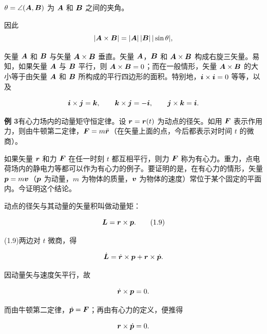$\theta = \angle(\bm{A}, \bm{B})$ 为 $\bm{A}$ 和 $\bm{B}$ 之间的夹角。

因此
\begin{equation*}
|\bm{A} \times \bm{B}| = |\bm{A}|\,|\bm{B}|\,|\sin\theta|,
\end{equation*}

矢量 $\bm{A}$ 和 $\bm{B}$ 与矢量 $\bm{A} \times \bm{B}$ 垂直。矢量 $\bm{A}$，$\bm{B}$ 和 $\bm{A} \times \bm{B}$ 构成右旋三矢量。易知，如果矢量 $\bm{A}$ 与 $\bm{B}$ 平行，则 $\bm{A} \times \bm{B} = 0$；而在一般情形，矢量 $\bm{A} \times \bm{B}$ 的大小等于由矢量 $\bm{A}$ 和 $\bm{B}$ 所构成的平行四边形的面积。特别地，$\bm{i} \times \bm{i} = 0$ 等等，以及

\begin{equation*}
\bm{i} \times \bm{j} = \bm{k}, \qquad \bm{k} \times \bm{j} = -\bm{i}, \qquad \bm{j} \times \bm{k} = \bm{i}.
\end{equation*}

\textbf{例 3}\quad 有心力场内的动量矩守恒定律。设 $\bm{r} = \bm{r}(t)$ 为动点的径矢。如用 $\bm{F}$ 表示作用力，则由牛顿第二定律，$\bm{F} = m \ddot{\bm{r}}$（在矢量上面的点，今后都表示对时间 $t$ 的微商）。

如果矢量 $\bm{r}$ 和力 $\bm{F}$ 在任一时刻 $t$ 都互相平行，则力 $\bm{F}$ 称为有心力。重力，点电荷场内的静电力等都可以作为有心力的例子。要证明的是，在有心力的情形，矢量 $\bm{p} = m\bm{v}$（$\bm{p}$ 为动量，$m$ 为物体的质量，$\bm{v}$ 为物体的速度）常位于某个固定的平面内。今证明这个结论。

动点的径矢与其动量的矢量积叫做动量矩：

\begin{equation}
\bm{L} = \bm{r} \times \bm{p}.
\tag{1.9}
\end{equation}

(1.9)两边对 $t$ 微商，得

\begin{equation*}
\dot{\bm{L}} = \dot{\bm{r}} \times \bm{p} + \bm{r} \times \dot{\bm{p}}.
\end{equation*}

因动量矢与速度矢平行，故

\begin{equation*}
\dot{\bm{r}} \times \bm{p} = 0.
\end{equation*}

而由牛顿第二定律，$\dot{\bm{p}} = \bm{F}$；再由有心力的定义，便推得

\begin{equation*}
\bm{r} \times \dot{\bm{p}} = 0.
\end{equation*}

